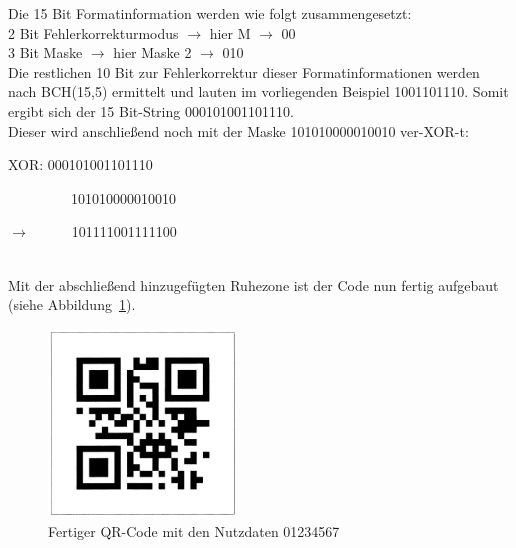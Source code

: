 Die 15 Bit Formatinformation werden wie folgt zusammengesetzt:\\
2 Bit Fehlerkorrekturmodus $\rightarrow$ hier M $\rightarrow$ 00 \\
3 Bit Maske  $\rightarrow$ hier Maske 2  $\rightarrow$ 010 \\
Die restlichen 10 Bit zur Fehlerkorrektur dieser Formatinformationen werden nach BCH(15,5) ermittelt und lauten im vorliegenden Beispiel 1001101110.
Somit ergibt sich der 15 Bit-String 000101001101110.\\
Dieser wird anschließend noch mit der Maske 101010000010010 ver-XOR-t:\\
\centerline{XOR: 000101001101110}
\centerline{~~~~~~~~~101010000010010}
\centerline{$\rightarrow$~~~~~~101111001111100}\\
Mit der abschließend hinzugefügten Ruhezone ist der Code nun fertig aufgebaut (siehe Abbildung~\ref{fig:qrexamplefinal}).
\begin{figure}[htbp]
	\centering
	\includegraphics[width=5cm]{Bilder/QR_Example_Final.png}
	\caption[Fertiger QR-Code mit den Nutzdaten 01234567]{Fertiger QR-Code mit den Nutzdaten 01234567\footnotemark}
	\label{fig:qrexamplefinal}
\end{figure}
~\pagebreak

